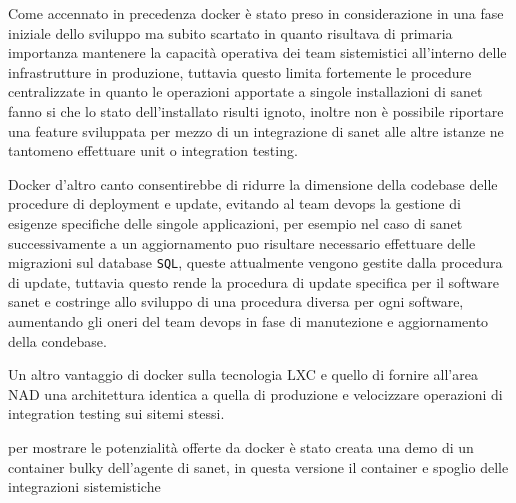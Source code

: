 Come accennato in precedenza docker\cite{docker} è stato preso in considerazione in una fase iniziale dello sviluppo ma subito scartato in quanto risultava di primaria importanza mantenere la capacità operativa dei team sistemistici all'interno delle infrastrutture in produzione, tuttavia questo limita fortemente le procedure centralizzate in quanto le operazioni apportate a singole installazioni di sanet fanno si che lo stato dell'installato risulti ignoto, inoltre non è possibile riportare una feature sviluppata per mezzo di un integrazione di sanet alle altre istanze ne tantomeno effettuare unit o integration testing.

Docker d'altro canto consentirebbe di ridurre la dimensione della codebase delle procedure di deployment e update, evitando al team devops la gestione di esigenze specifiche delle singole applicazioni, per esempio nel caso di sanet successivamente a un aggiornamento puo risultare necessario effettuare delle migrazioni sul database \verb|SQL|, queste attualmente vengono gestite dalla procedura di update, tuttavia questo rende la procedura di update specifica per il software sanet e costringe allo sviluppo di una procedura diversa per ogni software, aumentando gli oneri del team devops in fase di manutezione e aggiornamento della condebase.

Un altro vantaggio di docker\cite{docker} sulla tecnologia LXC\cite{lxc} e quello di fornire all'area NAD una architettura identica a quella di produzione e velocizzare operazioni di integration testing sui sitemi stessi.

per mostrare le potenzialità offerte da docker è stato creata una demo di un container bulky dell'agente di sanet, in questa versione il container e spoglio delle integrazioni sistemistiche

